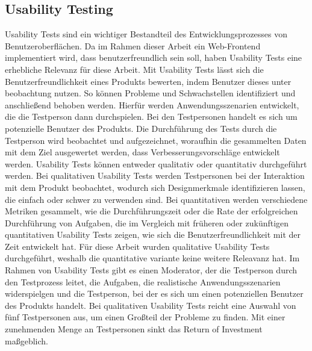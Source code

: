\subsection{Usability Testing}
Usability Tests sind ein wichtiger Bestandteil des Entwicklungsprozesses von Benutzeroberflächen. Da im Rahmen dieser Arbeit ein Web-Frontend implementiert wird, dass benutzerfreundlich sein soll, haben Usability Tests eine erhebliche Relevanz für diese Arbeit.
Mit Usability Tests lässt sich die Benutzerfreundlichkeit eines Produkts bewerten, indem Benutzer dieses unter beobachtung nutzen. So können Probleme und Schwachstellen identifiziert und anschließend behoben werden. Hierfür werden Anwendungsszenarien entwickelt, die die Testperson dann durchspielen. Bei den Testpersonen handelt es sich um potenzielle Benutzer des Produkts. Die Durchführung des Tests durch die Testperson wird beobachtet und aufgezeichnet, woraufhin die gesammelten Daten mit dem Ziel ausgewertet werden, dass Verbesserungsvorschläge entwickelt werden.
Usability Tests können entweder qualitativ oder quantitativ durchgeführt werden. Bei qualitativen Usability Tests werden Testpersonen bei der Interaktion mit dem Produkt beobachtet, wodurch sich Designmerkmale identifizieren lassen, die einfach oder schwer zu verwenden sind. Bei quantitativen werden verschiedene Metriken gesammelt, wie die Durchführungszeit oder die Rate der erfolgreichen Durchführung von Aufgaben, die im Vergleich mit früheren oder zukünftigen quantitativen Usability Tests zeigen, wie sich die Benutzerfreundlichkeit mit der Zeit entwickelt hat.
Für diese Arbeit wurden qualitative Usability Tests durchgeführt, weshalb die quantitative variante keine weitere Releavanz hat.
Im Rahmen von Usability Tests gibt es einen Moderator, der die Testperson durch den Testprozess leitet, die Aufgaben, die realistische Anwendungsszenarien widerspielgen und die Testperson, bei der es sich um einen potenziellen Benutzer des Produkts handelt. 
Bei qualitativen Usability Tests reicht eine Auswahl von fünf Testpersonen aus, um einen Großteil der Probleme zu finden. Mit einer zunehmenden Menge an Testpersonen sinkt das Return of Investment maßgeblich.
